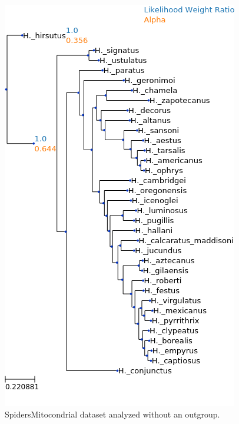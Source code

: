 \documentclass{article}
\begin{document}
\begin{figure}
  \begin{center}

    \includegraphics[width=.75\linewidth]{figs/spiders/mito_no_outgroup_lwr.png}
    \caption{SpidersMitocondrial dataset analyzed without an outgroup.}
    \label{fig:spiders-mito-no-outgroup}
  \end{center}
\end{figure}
\end{document}

